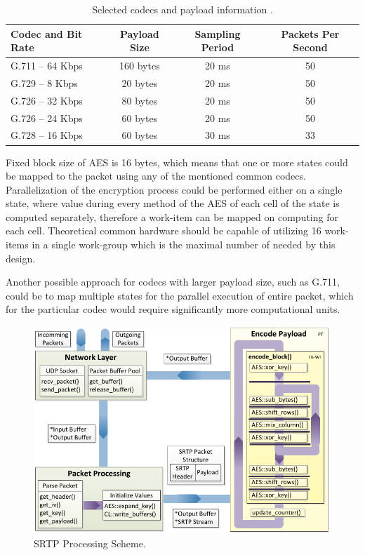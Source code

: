 \begin{table}[H]
\begin{center}
\begin{tabular}{|l|ccc|}\hline%
  Codec and Bit Rate & Payload Size & Sampling Period & Packets Per Second\\\hline
  G.711 -- 64 Kbps   & 160 bytes    & 20 ms           & 50 \\
  G.729 -- 8 Kbps    & 20 bytes     & 20 ms           & 50 \\
  G.726 -- 32 Kbps   & 80 bytes     & 20 ms           & 50 \\
  G.726 -- 24 Kbps   & 60 bytes     & 20 ms           & 50 \\
  G.728 -- 16 Kbps   & 60 bytes     & 30 ms           & 33 \\
 \hline
\end{tabular}
\end{center}
\caption{Selected codecs and payload information \cite{rtpbandwidth}.}
\label{bandwidth}
\end{table}

Fixed block size of AES is 16 bytes, which means that one or more states could
be mapped to the packet using any of the mentioned common codecs. Parallelization
of the encryption process could be performed either on a single state, where
value during every method of the AES of each cell of the state is computed 
separately, therefore a work-item can be mapped on computing for each cell. 
Theoretical common hardware should be capable of utilizing 16 work-items in a 
single work-group which is the maximal number of needed by this design.

Another possible approach for codecs with larger payload size, such as G.711, 
could be to map multiple states for the parallel execution of entire packet, 
which for the particular codec would require significantly more computational 
units. 

\vspace{1em}

\begin{figure}[h!]
\centering
\includegraphics[width=15cm]{fig/paral_scheme.pdf}
\caption{SRTP Processing Scheme.}
\label{scheme}
\end{figure}

